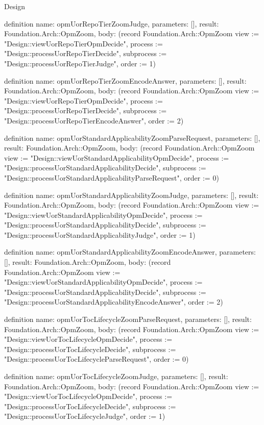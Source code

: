 \begin{lexlean}{Design}
\begin{semanticmodule}
definition{
  name: opmUorRepoTierZoomJudge,
  parameters: [],
  result: Foundation.Arch::OpmZoom,
  body: (record Foundation.Arch::OpmZoom {view := "Design::viewUorRepoTierOpmDecide", process := "Design::processUorRepoTierDecide", subprocess := "Design::processUorRepoTierJudge", order := 1})
}

definition{
  name: opmUorRepoTierZoomEncodeAnswer,
  parameters: [],
  result: Foundation.Arch::OpmZoom,
  body: (record Foundation.Arch::OpmZoom {view := "Design::viewUorRepoTierOpmDecide", process := "Design::processUorRepoTierDecide", subprocess := "Design::processUorRepoTierEncodeAnswer", order := 2})
}

definition{
  name: opmUorStandardApplicabilityZoomParseRequest,
  parameters: [],
  result: Foundation.Arch::OpmZoom,
  body: (record Foundation.Arch::OpmZoom {view := "Design::viewUorStandardApplicabilityOpmDecide", process := "Design::processUorStandardApplicabilityDecide", subprocess := "Design::processUorStandardApplicabilityParseRequest", order := 0})
}

definition{
  name: opmUorStandardApplicabilityZoomJudge,
  parameters: [],
  result: Foundation.Arch::OpmZoom,
  body: (record Foundation.Arch::OpmZoom {view := "Design::viewUorStandardApplicabilityOpmDecide", process := "Design::processUorStandardApplicabilityDecide", subprocess := "Design::processUorStandardApplicabilityJudge", order := 1})
}

definition{
  name: opmUorStandardApplicabilityZoomEncodeAnswer,
  parameters: [],
  result: Foundation.Arch::OpmZoom,
  body: (record Foundation.Arch::OpmZoom {view := "Design::viewUorStandardApplicabilityOpmDecide", process := "Design::processUorStandardApplicabilityDecide", subprocess := "Design::processUorStandardApplicabilityEncodeAnswer", order := 2})
}

definition{
  name: opmUorTocLifecycleZoomParseRequest,
  parameters: [],
  result: Foundation.Arch::OpmZoom,
  body: (record Foundation.Arch::OpmZoom {view := "Design::viewUorTocLifecycleOpmDecide", process := "Design::processUorTocLifecycleDecide", subprocess := "Design::processUorTocLifecycleParseRequest", order := 0})
}

definition{
  name: opmUorTocLifecycleZoomJudge,
  parameters: [],
  result: Foundation.Arch::OpmZoom,
  body: (record Foundation.Arch::OpmZoom {view := "Design::viewUorTocLifecycleOpmDecide", process := "Design::processUorTocLifecycleDecide", subprocess := "Design::processUorTocLifecycleJudge", order := 1})
}


\end{semanticmodule}
\end{lexlean}
